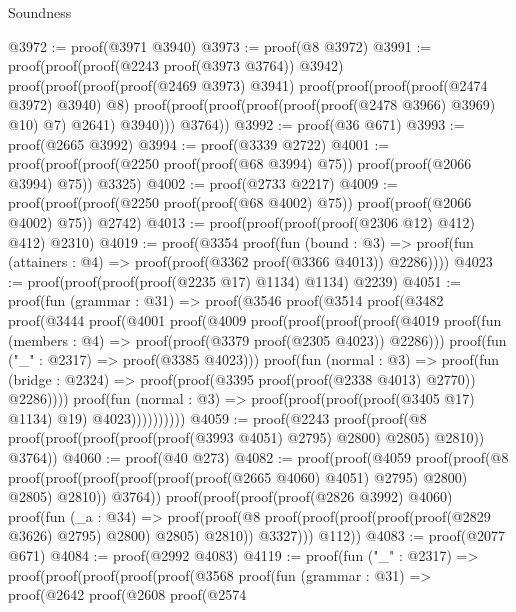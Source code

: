 \begin{lexlean}{Soundness}
\begin{coremodule}
@3972 := proof(@3971 @3940)
@3973 := proof(@8 @3972)
@3991 := proof(proof(proof(@2243 proof(@3973 @3764)) @3942)
      proof(proof(proof(proof(@2469 @3973) @3941)
            proof(proof(proof(proof(@2474 @3972) @3940) @8)
                proof(proof(proof(proof(proof(proof(@2478 @3966) @3969) @10) @7) @2641) @3940)))
          @3764))
@3992 := proof(@36 @671)
@3993 := proof(@2665 @3992)
@3994 := proof(@3339 @2722)
@4001 := proof(proof(proof(@2250 proof(proof(@68 @3994) @75)) proof(proof(@2066 @3994) @75)) @3325)
@4002 := proof(@2733 @2217)
@4009 := proof(proof(proof(@2250 proof(proof(@68 @4002) @75)) proof(proof(@2066 @4002) @75)) @2742)
@4013 := proof(proof(proof(proof(@2306 @12) @412) @412) @2310)
@4019 := proof(@3354
      proof(fun (bound : @3) =>
        proof(fun (attainers : @4) => proof(proof(@3362 proof(@3366 @4013)) @2286))))
@4023 := proof(proof(proof(proof(@2235 @17) @1134) @1134) @2239)
@4051 := proof(fun (grammar : @31) =>
    proof(@3546
        proof(@3514
            proof(@3482
                proof(@3444
                    proof(@4001
                        proof(@4009
                            proof(proof(proof(proof(@4019
                                      proof(fun (members : @4) =>
                                        proof(proof(@3379 proof(@2305 @4023)) @2286)))
                                    proof(fun ("_" : @2317) => proof(@3385 @4023)))
                                  proof(fun (normal : @3) =>
                                    proof(fun (bridge : @2324) =>
                                      proof(proof(@3395 proof(proof(@2338 @4013) @2770)) @2286))))
                                proof(fun (normal : @3) =>
                                  proof(proof(proof(proof(@3405 @17) @1134) @19) @4023))))))))))
@4059 := proof(@2243
      proof(proof(@8 proof(proof(proof(proof(proof(@3993 @4051) @2795) @2800) @2805) @2810)) @3764))
@4060 := proof(@40 @273)
@4082 := proof(proof(@4059
        proof(proof(@8
              proof(proof(proof(proof(proof(proof(@2665 @4060) @4051) @2795) @2800) @2805) @2810))
            @3764))
      proof(proof(proof(proof(@2826 @3992) @4060)
            proof(fun (_a : @34) =>
              proof(proof(@8 proof(proof(proof(proof(proof(@2829 @3626) @2795) @2800) @2805) @2810))
                  @3327)))
          @112))
@4083 := proof(@2077 @671)
@4084 := proof(@2992 @4083)
@4119 := proof(fun ("_" : @2317) =>
    proof(proof(proof(proof(proof(@3568
                proof(fun (grammar : @31) =>
                  proof(@2642
                      proof(@2608
                          proof(@2574

\end{coremodule}
\end{lexlean}
